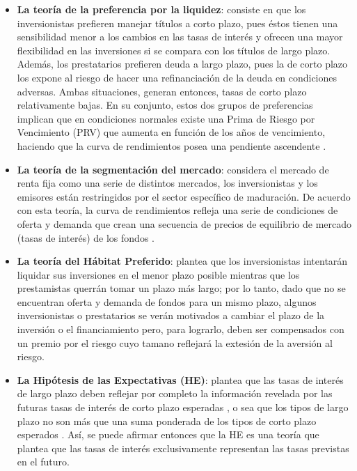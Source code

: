 \documentclass[
  12pt,
]{krantz}
\begin{document}
\begin{itemize}
\item
  \textbf{La teoría de la preferencia por la liquidez}: consiste en que los inversionistas prefieren manejar títulos a corto plazo, pues éstos tienen una sensibilidad menor a los cambios en las tasas de interés y ofrecen una mayor flexibilidad en las inversiones si se compara con los títulos de largo plazo. Además, los prestatarios prefieren deuda a largo plazo, pues la de corto plazo los expone al riesgo de hacer una refinanciación de la deuda en condiciones adversas. Ambas situaciones, generan entonces, tasas de corto plazo relativamente bajas. En su conjunto, estos dos grupos de preferencias implican que en condiciones normales existe una Prima de Riesgo por Vencimiento (PRV) que aumenta en función de los años de vencimiento, haciendo que la curva de rendimientos posea una pendiente ascendente \cite{DO}.
\item
  \textbf{La teoría de la segmentación del mercado}: considera el mercado de renta fija como una serie de distintos mercados, los inversionistas y los emisores están restringidos por el sector específico de maduración. De acuerdo con esta teoría, la curva de rendimientos refleja una serie de condiciones de oferta y demanda que crean una secuencia de precios de equilibrio de mercado (tasas de interés) de los fondos \cite{DO}.
\item
  \textbf{La teoría del Hábitat Preferido}: plantea que los inversionistas intentarán liquidar sus inversiones en el menor plazo posible mientras que los prestamistas querrán tomar un plazo más largo; por lo tanto, dado que no se encuentran oferta y demanda de fondos para un mismo plazo, algunos inversionistas o prestatarios se verán motivados a cambiar el plazo de la inversión o el financiamiento pero, para lograrlo, deben ser compensados con un premio por el riesgo cuyo tamano reflejará la extesión de la aversión al riesgo.
\item
  \textbf{La Hipótesis de las Expectativas (HE)}: plantea que las tasas de interés de largo plazo deben reflejar por completo la información revelada por las futuras tasas de interés de corto plazo esperadas \cite{YS}, o sea que los tipos de largo plazo no son más que una suma ponderada de los tipos de corto plazo esperados \cite{FR}. Así, se puede afirmar entonces que la HE es una teoría que plantea que las tasas de interés exclusivamente representan las tasas previstas en el futuro.
\end{itemize}
\end{document}
